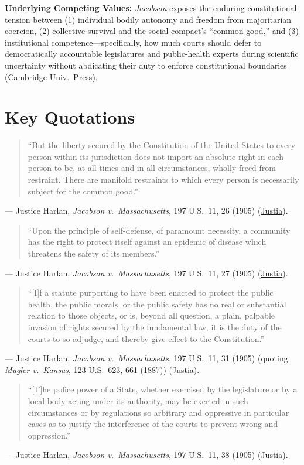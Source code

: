 \documentclass[12pt]{article}
\begin{document}
\textbf{Underlying Competing Values:} \textit{Jacobson} exposes the enduring constitutional tension between (1) individual bodily autonomy and freedom from majoritarian coercion, (2) collective survival and the social compact's ``common good,'' and (3) institutional competence---specifically, how much courts should defer to democratically accountable legislatures and public-health experts during scientific uncertainty without abdicating their duty to enforce constitutional boundaries (\href{https://www.cambridge.org/core/books/covid19-and-the-law/jacobson-question/A463868C48886F30BD127463D9796626}{Cambridge Univ.\ Press}).

\section{Key Quotations}

\begin{quote}
``But the liberty secured by the Constitution of the United States to every person within its jurisdiction does not import an absolute right in each person to be, at all times and in all circumstances, wholly freed from restraint. There are manifold restraints to which every person is necessarily subject for the common good.''
\end{quote}
\noindent --- Justice Harlan, \textit{Jacobson v.\ Massachusetts}, 197 U.S.\ 11, 26 (1905) (\href{https://supreme.justia.com/cases/federal/us/197/11/}{Justia}).

\begin{quote}
``Upon the principle of self-defense, of paramount necessity, a community has the right to protect itself against an epidemic of disease which threatens the safety of its members.''
\end{quote}
\noindent --- Justice Harlan, \textit{Jacobson v.\ Massachusetts}, 197 U.S.\ 11, 27 (1905) (\href{https://supreme.justia.com/cases/federal/us/197/11/}{Justia}).

\begin{quote}
``[I]f a statute purporting to have been enacted to protect the public health, the public morals, or the public safety has no real or substantial relation to those objects, or is, beyond all question, a plain, palpable invasion of rights secured by the fundamental law, it is the duty of the courts to so adjudge, and thereby give effect to the Constitution.''
\end{quote}
\noindent --- Justice Harlan, \textit{Jacobson v.\ Massachusetts}, 197 U.S.\ 11, 31 (1905) (quoting \textit{Mugler v.\ Kansas}, 123 U.S.\ 623, 661 (1887)) (\href{https://supreme.justia.com/cases/federal/us/197/11/}{Justia}).

\begin{quote}
``[T]he police power of a State, whether exercised by the legislature or by a local body acting under its authority, may be exerted in such circumstances or by regulations so arbitrary and oppressive in particular cases as to justify the interference of the courts to prevent wrong and oppression.''
\end{quote}
\noindent --- Justice Harlan, \textit{Jacobson v.\ Massachusetts}, 197 U.S.\ 11, 38 (1905) (\href{https://supreme.justia.com/cases/federal/us/197/11/}{Justia}).
\end{document}
